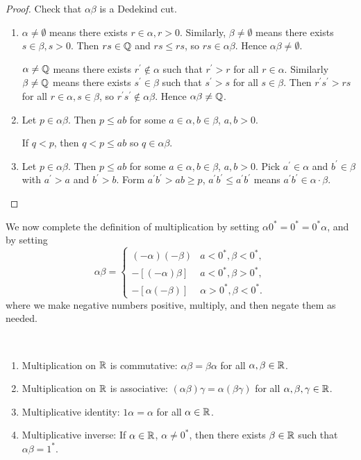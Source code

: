 \begin{proof}
Check that $\alpha\beta$ is a Dedekind cut.
\begin{enumerate}[label=(\roman*)]
\item $\alpha\neq\emptyset$ means there exists $r\in\alpha,r>0$. Similarly, $\beta\neq\emptyset$ means there exists $s\in\beta,s>0$. Then $rs\in\mathbb Q$ and $rs\le rs$, so $rs\in\alpha\beta$. Hence $\alpha\beta\neq\emptyset$.

$\alpha\neq\mathbb Q$ means there exists $r^\prime\notin\alpha$ such that $r^\prime>r$ for all $r\in\alpha$. Similarly $\beta\neq\mathbb Q$ means there exists $s^\prime\in\beta$ such that $s^\prime>s$ for all $s\in\beta$. Then $r^\prime s^\prime>rs$ for all $r\in\alpha,s\in\beta$, so $r^\prime s^\prime\notin\alpha\beta$. Hence $\alpha\beta\neq\mathbb Q$.

\item Let $p\in\alpha\beta$. Then $p\le ab$ for some $a\in\alpha,b\in\beta$, $a,b>0$.

If $q<p$, then $q<p\le ab$ so $q\in\alpha\beta$.

\item Let $p\in\alpha\beta$. Then $p\le ab$ for some $a\in\alpha,b\in\beta$, $a,b>0$. Pick $a^\prime\in\alpha$ and $b^\prime\in\beta$ with $a^\prime>a$ and $b^\prime>b$. Form $a^\prime b^\prime>ab\ge p$, $a^\prime b^\prime\le a^\prime b^\prime$ means $a^\prime b^\prime\in\alpha\cdot\beta$.
\end{enumerate}
\end{proof}

We now complete the definition of multiplication by setting $\alpha0^*=0^*=0^*\alpha$, and by setting
\[\alpha\beta=\begin{cases}
(-\alpha)(-\beta)&a<0^*,\beta<0^*,\\
-[(-\alpha)\beta]&a<0^*,\beta>0^*,\\
-[\alpha(-\beta)]&\alpha>0^*,\beta<0^*.
\end{cases}\]
where we make negative numbers positive, multiply, and then negate them as needed.

\begin{proposition} \
\begin{enumerate}[label=(\roman*)]
\item Multiplication on $\mathbb R$ is commutative: $\alpha\beta=\beta\alpha$ for all $\alpha,\beta\in\mathbb R$.
\item Multiplication on $\mathbb R$ is associative: $(\alpha\beta)\gamma=\alpha(\beta\gamma)$ for all $\alpha,\beta,\gamma\in\mathbb R$.
\item Multiplicative identity: $1\alpha=\alpha$ for all $\alpha\in\mathbb R$.
\item Multiplicative inverse: If $\alpha\in\mathbb R$, $\alpha\neq0^*$, then there exists $\beta\in\mathbb R$ such that $\alpha\beta=1^*$.
\end{enumerate}
\end{proposition}

